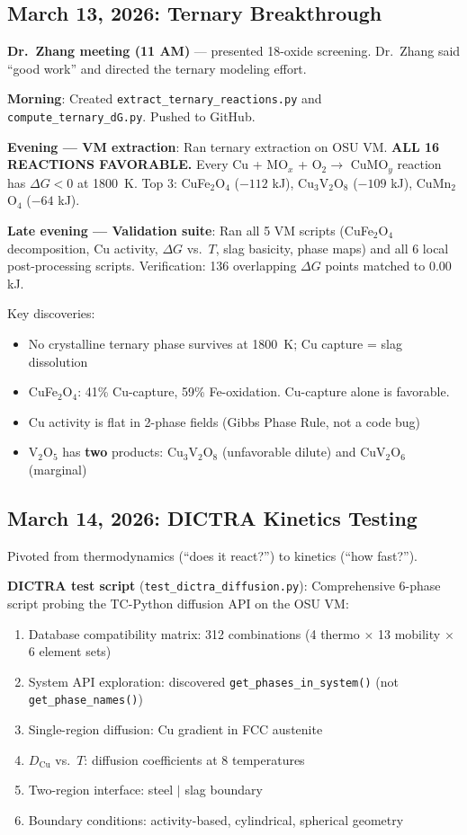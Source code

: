 \documentclass[11pt]{article}
\begin{document}
\subsection{March 13, 2026: Ternary Breakthrough}

\textbf{Dr.\ Zhang meeting (11 AM)} --- presented 18-oxide screening. Dr.\ Zhang said ``good work'' and directed the ternary modeling effort.

\textbf{Morning}: Created \texttt{extract\_ternary\_reactions.py} and \texttt{compute\_ternary\_dG.py}. Pushed to GitHub.

\textbf{Evening --- VM extraction}: Ran ternary extraction on OSU VM. \textbf{ALL 16 REACTIONS FAVORABLE.} Every Cu + MO$_x$ + O$_2 \to$ CuMO$_y$ reaction has $\Delta G < 0$ at \SI{1800}{\kelvin}. Top 3: CuFe$_2$O$_4$ ($-112$ kJ), Cu$_3$V$_2$O$_8$ ($-109$ kJ), CuMn$_2$O$_4$ ($-64$ kJ).

\textbf{Late evening --- Validation suite}: Ran all 5 VM scripts (CuFe$_2$O$_4$ decomposition, Cu activity, $\Delta G$ vs.\ $T$, slag basicity, phase maps) and all 6 local post-processing scripts. Verification: 136 overlapping $\Delta G$ points matched to 0.00 kJ.

Key discoveries:
\begin{itemize}[leftmargin=*]
    \item No crystalline ternary phase survives at \SI{1800}{\kelvin}; Cu capture = slag dissolution
    \item CuFe$_2$O$_4$: 41\% Cu-capture, 59\% Fe-oxidation. Cu-capture alone is favorable.
    \item Cu activity is flat in 2-phase fields (Gibbs Phase Rule, not a code bug)
    \item V$_2$O$_5$ has \textbf{two} products: Cu$_3$V$_2$O$_8$ (unfavorable dilute) and CuV$_2$O$_6$ (marginal)
\end{itemize}

\subsection{March 14, 2026: DICTRA Kinetics Testing}

Pivoted from thermodynamics (``does it react?'') to kinetics (``how fast?'').

\textbf{DICTRA test script} (\texttt{test\_dictra\_diffusion.py}): Comprehensive 6-phase script probing the TC-Python diffusion API on the OSU VM:
\begin{enumerate}[leftmargin=*]
    \item Database compatibility matrix: 312 combinations (4 thermo $\times$ 13 mobility $\times$ 6 element sets)
    \item System API exploration: discovered \texttt{get\_phases\_in\_system()} (not \texttt{get\_phase\_names()})
    \item Single-region diffusion: Cu gradient in FCC austenite
    \item $D_{\text{Cu}}$ vs.\ $T$: diffusion coefficients at 8 temperatures
    \item Two-region interface: steel $|$ slag boundary
    \item Boundary conditions: activity-based, cylindrical, spherical geometry
\end{enumerate}
\end{document}
